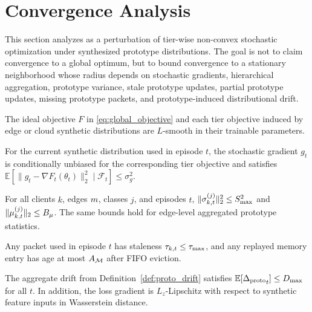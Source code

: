 \section{Convergence Analysis}
\label{sec:convergence}

This section analyzes \ehsfp as a perturbation of tier-wise non-convex stochastic optimization under synthesized prototype distributions. The goal is not to claim convergence to a global optimum, but to bound convergence to a stationary neighborhood whose radius depends on stochastic gradients, hierarchical aggregation, prototype variance, stale prototype updates, partial prototype updates, missing prototype packets, and prototype-induced distributional drift.

\begin{assumption}\label{asm:smooth}
The ideal objective $F$ in \eqref{eq:global_objective} and each tier objective induced by edge or cloud synthetic distributions are $L$-smooth in their trainable parameters.
\end{assumption}

\begin{assumption}\label{asm:variance}
For the current synthetic distribution used in episode $t$, the stochastic gradient $g_t$ is conditionally unbiased for the corresponding tier objective and satisfies $\mathbb{E}[\|g_t-\nabla F_t(\theta_t)\|_2^2\mid\mathcal{F}_t]\leq\sigma_g^2$.
\end{assumption}

\begin{assumption}\label{asm:proto_var}
For all clients $k$, edges $m$, classes $j$, and episodes $t$, $\|\sigma_{k,t}^{(j)}\|_2^2\leq S_{\max}^2$ and $\|\mu_{k,t}^{(j)}\|_2\leq B_{\mu}$. The same bounds hold for edge-level aggregated prototype statistics.
\end{assumption}

\begin{assumption}\label{asm:staleness}
Any packet used in episode $t$ has staleness $\tau_{k,t}\leq\tau_{\max}$, and any replayed memory entry has age at most $A_{\mathcal{M}}$ after FIFO eviction.
\end{assumption}

\begin{assumption}\label{asm:drift}
The aggregate drift from Definition~\ref{def:proto_drift} satisfies $\mathbb{E}[{\Delta_{\mathrm{proto}}}_t]\leq D_{\max}$ for all $t$. In addition, the loss gradient is $L_z$-Lipschitz with respect to synthetic feature inputs in Wasserstein distance.
\end{assumption}

